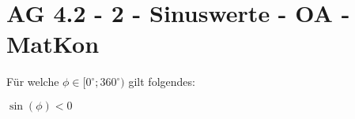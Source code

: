 \section{AG 4.2 - 2 - Sinuswerte - OA - MatKon}

\begin{beispiel}[AG 4.2]{1} %
				Für welche $\phi \in [0^\circ;360^\circ)$ gilt folgendes:
				
				\begin{center}
				$\sin(\phi)<0$
				\end{center}
\end{beispiel}
